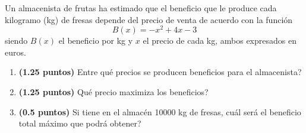 
Un almacenista de frutas ha estimado que el beneficio que le produce cada kilogramo (kg) de fresas depende del precio de venta de acuerdo con la función
\[
B(x)=-x^2+4x-3
\]
siendo $B(x)$ el beneficio por kg y $x$ el precio de cada kg, ambos expresados en euros.
\begin{enumerate}[label=\alph*)]
\item \textbf{(1.25 puntos)} \textquestiondown{}Entre qué precios se producen beneficios para el almacenista?
\item \textbf{(1.25 puntos)} \textquestiondown{}Qué precio maximiza los beneficios?
\item \textbf{(0.5 puntos)} Si tiene en el almacén 10000 kg de fresas, \textquestiondown{}cuál será el beneficio total máximo que podrá obtener?
\end{enumerate}
